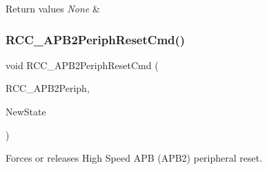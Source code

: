 \begin{DoxyRetVals}{Return values}
{\em None} & \\
\hline
\end{DoxyRetVals}
\mbox{\label{group___r_c_c_gad94553850ac07106a27ee85fec37efdf}} 
\subsubsection{\texorpdfstring{R\+C\+C\+\_\+\+A\+P\+B2\+Periph\+Reset\+Cmd()}{RCC\_APB2PeriphResetCmd()}}
{\footnotesize\ttfamily void R\+C\+C\+\_\+\+A\+P\+B2\+Periph\+Reset\+Cmd (\begin{DoxyParamCaption}\item[{uint32\+\_\+t}]{R\+C\+C\+\_\+\+A\+P\+B2\+Periph,  }\item[{Functional\+State}]{New\+State }\end{DoxyParamCaption})}



Forces or releases High Speed A\+PB (A\+P\+B2) peripheral reset. 



